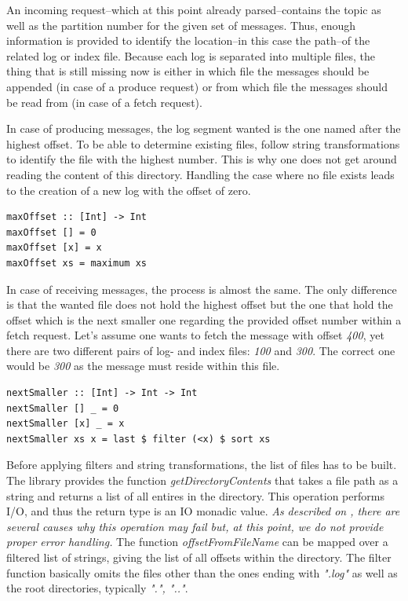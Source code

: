 An incoming request--which at this point already parsed--contains the
topic as well as the partition number for the given set of messages. Thus,
enough information is provided to identify the location--in this case the path--of the related log or index file. Because each log is separated into multiple
files, the thing that is still missing now is either in
which file the messages should be appended (in case of a produce request) or
from which file the messages should be read from (in case of a fetch request).

In case of producing messages, the log segment wanted is the one named after the
highest offset. To be able to determine existing files, follow string
transformations to identify the file with the highest number. This is why one
does not get around reading the content of this directory. Handling the case
where no file exists leads to the creation of a new log with the offset of zero.

\begin{lstlisting}[caption={Determining highest offset of given list}]
maxOffset :: [Int] -> Int
maxOffset [] = 0
maxOffset [x] = x
maxOffset xs = maximum xs
\end{lstlisting}

In case of receiving messages, the process is almost the same. The only
difference is that the wanted file does not hold the highest offset but the one
that hold the offset which is the next smaller one regarding the provided offset
number within a fetch request. Let's assume one wants to fetch the message with
offset \textit{400}, yet there are two different pairs of log- and index
files: \textit{100} and \textit{300}. The correct one would be \textit{300} as the
message must reside within this file.

\begin{lstlisting}[caption={Determining offset which is next smaller regarding given offset}]
%todo: code for next smaller
nextSmaller :: [Int] -> Int -> Int
nextSmaller [] _ = 0
nextSmaller [x] _ = x
nextSmaller xs x = last $ filter (<x) $ sort xs
\end{lstlisting}

Before applying filters and string transformations, the list of files has to be
built. The library
provides the function \textit{getDirectoryContents} that takes a file path as a
string and returns a list of all entires in the directory. This operation
performs I/O, and thus the return type is an IO monadic value. \textit{As
described on
,
there are several causes why this operation may fail but, at this point, we do
not provide proper error handling.}
The function \textit{offsetFromFileName} can be mapped over a filtered list of
strings, giving the list of all offsets within the directory. The
filter function basically omits the files other than the ones ending with
\textit{".log"} as well as the root directories, typically \textit{".", ".."}.

